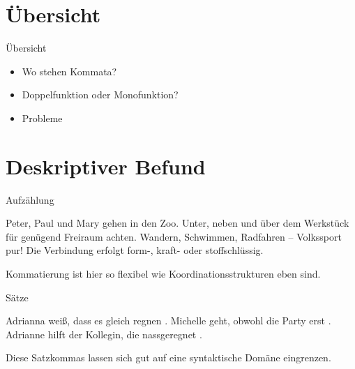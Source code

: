 \section{Übersicht}

\begin{frame}
  {Übersicht}
  \onslide<+->
  \begin{itemize}[<+->]
    \item Wo stehen Kommata?
      \Zeile
    \item Doppelfunktion oder Monofunktion?
    \item Probleme
  \end{itemize}
\end{frame}

\section[Befund]{Deskriptiver Befund}

\begin{frame}
  {Aufzählung}
  \onslide<+->
  \onslide<+->
  \begin{exe}
    \ex \alert{Peter, Paul und Mary} gehen in den Zoo.
    \ex \alert{Unter, neben und über} dem Werkstück für genügend Freiraum achten.
    \ex \alert{Wandern, Schwimmen, Radfahren} -- Volkssport pur!
    \ex Die Verbindung erfolgt \alert{form-, kraft- oder stoff}schlüssig.
  \end{exe}
  \onslide<+->
  \Zeile
  Kommatierung ist hier so flexibel wie Koordinationsstrukturen eben sind.
\end{frame}

\begin{frame}
  {Sätze}
  \onslide<+->
  \onslide<+->
  \begin{exe}
    \ex
    \begin{xlist}
	  \ex {}
	  \ex {}
    \end{xlist}
    \Zeile
    \ex Adrianna weiß, \alert{dass es gleich regnen} .
    \ex Michelle geht, \alert{obwohl die Party erst} .
    \ex Adrianne hilft der Kollegin, \alert{die nassgeregnet} .
    \Zeile
    \ex {}
  \end{exe}
  \onslide<+->
  \Zeile
  Diese Satzkommas lassen sich gut auf eine syntaktische Domäne eingrenzen.
\end{frame}

